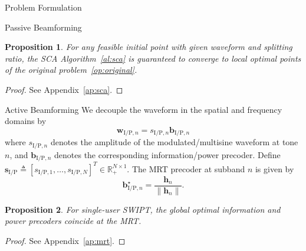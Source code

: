 \documentclass[journal]{IEEEtran}
\newtheorem{proposition}{Proposition}
\begin{document}
\begin{section}{Problem Formulation}
\begin{subsection}{Passive Beamforming}
			\begin{proposition}\label{pr:sca}
				For any feasible initial point with given waveform and splitting ratio, the SCA Algorithm~\ref{al:sca} is guaranteed to converge to local optimal points of the original problem~\eqref{op:original}.
			\end{proposition}

			\begin{proof}\label{pf:sca}
				See Appendix~\ref{ap:sca}.
			\end{proof}
		\end{subsection}

		\begin{subsection}{Active Beamforming}
			We decouple the waveform in the spatial and frequency domains by
			\begin{equation}\label{eq:w}
				\boldsymbol{w}_{\mathrm{I/P}, n} = s_{\mathrm{I/P}, n} \boldsymbol{b}_{\mathrm{I/P}, n}
			\end{equation}
			where $s_{\mathrm{I/P},n}$ denotes the amplitude of the modulated/multisine waveform at tone $n$, and $\boldsymbol{b}_{\mathrm{I/P}, n}$ denotes the corresponding information/power precoder. Define $\boldsymbol{s}_{\mathrm{I/P}} \triangleq [s_{\mathrm{I/P},1},\dots,s_{\mathrm{I/P},N}]^T \in \mathbb{R}_+^{N \times 1}$. The MRT precoder at subband $n$ is given by
			\begin{equation}\label{eq:b_n}
				\boldsymbol{b}_{\mathrm{I/P}, n}^\star = \frac{\boldsymbol{h}_n}{\lVert{\boldsymbol{h}_n}\rVert}.
			\end{equation}

			\begin{proposition}\label{pr:mrt}
				For single-user SWIPT, the global optimal information and power precoders coincide at the MRT.
			\end{proposition}

			\begin{proof}\label{pf:mrt}
				See Appendix~\ref{ap:mrt}.
			\end{proof}
		\end{subsection}



\end{section}
\end{document}
